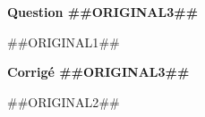 \documentclass[11pt]{article}
\begin{document}



\textbf{Question ##{{ORIGINAL3}}##} \par
##{{ORIGINAL1}}## \par




\textbf{Corrigé ##{{ORIGINAL3}}##} \par
##{{ORIGINAL2}}## \par



\end{document}
